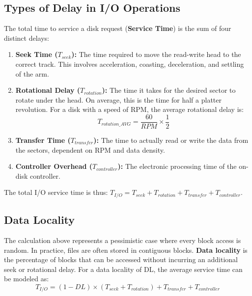 \subsection{Types of Delay in I/O Operations}
The total time to service a disk request (\textbf{Service Time}) is the sum of four distinct delays:
\begin{enumerate}
    \item \textbf{Seek Time ($T_{seek}$):} The time required to move the read-write head to the correct track. This involves acceleration, coasting, deceleration, and settling of the arm.
    \item \textbf{Rotational Delay ($T_{rotation}$):} The time it takes for the desired sector to rotate under the head. On average, this is the time for half a platter revolution. For a disk with a speed of RPM, the average rotational delay is:
    \begin{equation}
        T_{rotation\_AVG} = \frac{60}{RPM} \times \frac{1}{2}
    \end{equation}
    \item \textbf{Transfer Time ($T_{transfer}$):} The time to actually read or write the data from the sectors, dependent on RPM and data density.
    \item \textbf{Controller Overhead ($T_{controller}$):} The electronic processing time of the on-disk controller.
\end{enumerate}
The total I/O service time is thus: $T_{I/O} = T_{seek} + T_{rotation} + T_{transfer} + T_{controller}$.

\subsection{Data Locality}
The calculation above represents a pessimistic case where every block access is random. In practice, files are often stored in contiguous blocks. \textbf{Data locality} is the percentage of blocks that can be accessed without incurring an additional seek or rotational delay. For a data locality of DL, the average service time can be modeled as:
\begin{equation}
    T_{I/O} = (1-DL) \times (T_{seek} + T_{rotation}) + T_{transfer} + T_{controller}
\end{equation}

